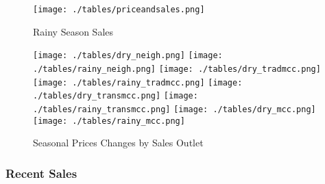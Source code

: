 \documentclass[11pt,letter,draft]{article}
\begin{document}
\begin{figure}[!th]
\centering
\caption{Rainy Season Sales}
\label{fig:recentsales}
\texttt{[image: ./tables/priceandsales.png]}
\footnotesize{
\parbox{10cm}{\vspace{2mm}  \baselineskip=11pt}}%
\end{figure}

\begin{figure}[!th]
\centering
\caption{Seasonal Prices Changes by Sales Outlet}
\label{fig:pricebysale}
\texttt{[image: ./tables/dry\_neigh.png]}
\texttt{[image: ./tables/rainy\_neigh.png]}
\texttt{[image: ./tables/dry\_tradmcc.png]}
\texttt{[image: ./tables/rainy\_tradmcc.png]}
\texttt{[image: ./tables/dry\_transmcc.png]}
\texttt{[image: ./tables/rainy\_transmcc.png]}
\texttt{[image: ./tables/dry\_mcc.png]}
\texttt{[image: ./tables/rainy\_mcc.png]}

\footnotesize{
\parbox{10cm}{\vspace{2mm}  \baselineskip=11pt}}%
\end{figure}





\clearpage
\subsubsection{Recent Sales}
\end{document}
